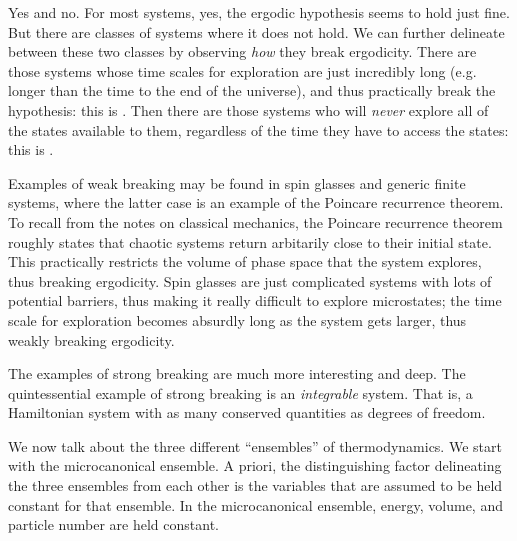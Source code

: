 \documentclass[11pt]{article}
\begin{document}
\begin{reemark}
    Yes and no. For most systems, yes, the ergodic hypothesis seems to 
    hold just fine. But there are classes of systems where it does not hold.
    We can further delineate between these two classes by observing \emph{how}
    they break ergodicity. There are those systems whose time scales for exploration
    are just incredibly long (e.g. longer than the time to the end of the universe),
    and thus practically break the hypothesis: this is .
    Then there are those systems who will \emph{never} explore all of the states
    available to them, regardless of the time they have to access the states:
    this is .

    Examples of weak breaking may be found in spin glasses and generic finite
    systems, where the latter case is an example of the Poincare recurrence theorem.
    To recall from the notes on classical mechanics, the Poincare recurrence theorem
    roughly states that chaotic systems return arbitarily close to their initial
    state. This practically restricts the volume of phase space that the system explores,
    thus breaking ergodicity. Spin glasses are just complicated systems with lots of
    potential barriers, thus making it really difficult to explore microstates; the time
    scale for exploration becomes absurdly long as the system gets larger, thus weakly
    breaking ergodicity.

    The examples of strong breaking are much more interesting and deep. The quintessential
    example of strong breaking is an \emph{integrable} system. That is, a Hamiltonian
    system with as many conserved quantities as degrees of freedom.
\end{reemark}

\begin{eexample}
\end{eexample}

We now talk about the three different ``ensembles'' of thermodynamics.
We start with the microcanonical ensemble. A priori, the distinguishing
factor delineating the three ensembles from each other is the variables
that are assumed to be held constant for that ensemble. In the microcanonical
ensemble, energy, volume, and particle number are held constant.

\end{document}

